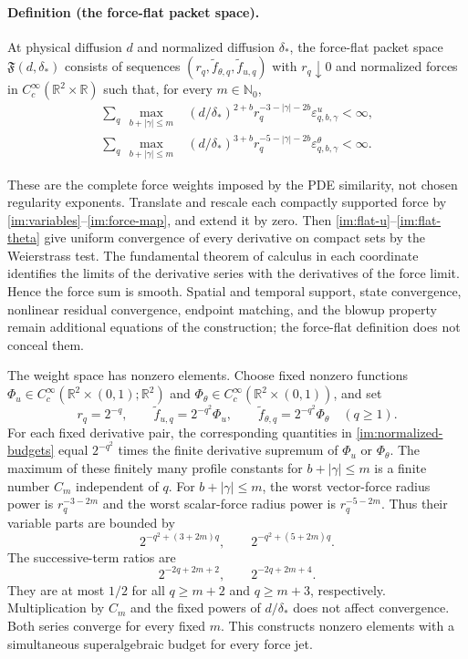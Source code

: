 \paragraph{Definition (the force-flat packet space).}\label{im:force-flat-definition}
At physical diffusion $d$ and normalized diffusion $\delta_*$, the
force-flat packet space $\mathfrak F(d,\delta_*)$ consists of sequences
$(r_q,\widetilde f_{\theta,q},\widetilde f_{u,q})$ with $r_q\downarrow0$
and normalized forces in
$C_c^\infty(\mathbb R^2\times\mathbb R)$ such that, for every
$m\in\mathbb N_0$,
\begin{align}
 \sum_q\ \max_{b+|\gamma|\leq m}
 &(d/\delta_*)^{2+b}
 r_q^{-3-|\gamma|-2b}\varepsilon^u_{q,b,\gamma}<\infty,
 \label{im:flat-u}\\
 \sum_q\ \max_{b+|\gamma|\leq m}
 &(d/\delta_*)^{3+b}
 r_q^{-5-|\gamma|-2b}\varepsilon^\theta_{q,b,\gamma}<\infty.
 \label{im:flat-theta}
\end{align}

These are the complete force weights imposed by the PDE similarity,
not chosen regularity exponents.  Translate and rescale each compactly
supported force by \eqref{im:variables}--\eqref{im:force-map}, and extend
it by zero.  Then \eqref{im:flat-u}--\eqref{im:flat-theta} give uniform
convergence of every derivative on compact sets by the Weierstrass test.
The fundamental theorem of calculus in each coordinate identifies the
limits of the derivative series with the derivatives of the force
limit.  Hence the force sum is smooth.  Spatial and temporal support,
state convergence, nonlinear residual convergence, endpoint matching,
and the blowup property remain additional equations of the construction;
the force-flat definition does not conceal them.

The weight space has nonzero elements.  Choose fixed nonzero functions
$\Phi_u\in C_c^\infty(\mathbb R^2\times(0,1);\mathbb R^2)$ and
$\Phi_\theta\in C_c^\infty(\mathbb R^2\times(0,1))$, and set
\begin{equation}\label{im:explicit-budget}
 r_q=2^{-q},\qquad
 \widetilde f_{u,q}=2^{-q^2}\Phi_u,\qquad
 \widetilde f_{\theta,q}=2^{-q^2}\Phi_\theta
 \quad(q\geq1).
\end{equation}
For each fixed derivative pair, the corresponding quantities in
\eqref{im:normalized-budgets} equal $2^{-q^2}$ times the finite
derivative supremum of $\Phi_u$ or $\Phi_\theta$.  The maximum of these
finitely many profile constants for $b+|\gamma|\leq m$ is a finite
number $C_m$ independent of $q$.
For $b+|\gamma|\leq m$, the worst vector-force radius power is
$r_q^{-3-2m}$ and the worst scalar-force radius power is
$r_q^{-5-2m}$.  Thus their variable parts are bounded by
\[
 2^{-q^2+(3+2m)q},\qquad
 2^{-q^2+(5+2m)q}.
\]
The successive-term ratios are
\[
 2^{-2q+2m+2},\qquad 2^{-2q+2m+4}.
\]
They are at most $1/2$ for all $q\geq m+2$ and $q\geq m+3$,
respectively.  Multiplication by $C_m$ and the fixed powers of
$d/\delta_*$ does not affect convergence.  Both series converge for
every fixed $m$.  This constructs nonzero elements with a simultaneous
superalgebraic budget for every force jet.

